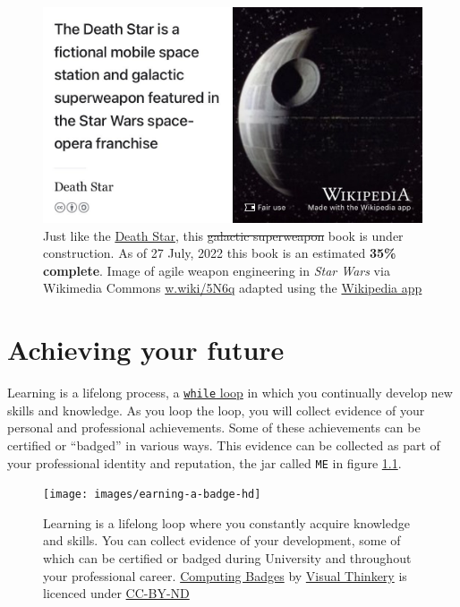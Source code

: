 \documentclass[
]{book}
\begin{document}
\begin{figure}

{\centering \includegraphics[width=0.99\linewidth]{images/DeathStar2} 

}

\caption{Just like the \href{https://en.wikipedia.org/wiki/Death_Star}{Death Star}, this \sout{galactic superweapon} book is under construction. As of 27 July, 2022 this book is an estimated \textbf{35\% complete}. Image of agile weapon engineering in \emph{Star Wars} via Wikimedia Commons \href{https://w.wiki/5N6q}{w.wiki/5N6q} adapted using the \href{https://apps.apple.com/gb/app/wikipedia/id324715238}{Wikipedia app}}\label{fig:deathstar7-fig}
\end{figure}

\hypertarget{achieving}{%
\chapter{Achieving your future}\label{achieving}}

Learning is a lifelong process, a \href{https://en.wikipedia.org/wiki/While_loop}{\texttt{while} loop} in which you continually develop new skills and knowledge. As you loop the loop, you will collect evidence of your personal and professional achievements. Some of these achievements can be certified or ``badged'' in various ways. This evidence can be collected as part of your professional identity and reputation, the jar called \texttt{ME} in figure \ref{fig:while-learning-fig}.

\begin{figure}

{\centering \texttt{[image: images/earning-a-badge-hd]} 

}

\caption{Learning is a lifelong loop where you constantly acquire knowledge and skills. You can collect evidence of your development, some of which can be certified or badged during University and throughout your professional career. \href{https://bryanmmathers.com/computing-badges/}{Computing Badges} by \href{https://visualthinkery.com/}{Visual Thinkery} is licenced under \href{https://creativecommons.org/licenses/by-nd/4.0/}{CC-BY-ND}}\label{fig:while-learning-fig}
\end{figure}
\end{document}
